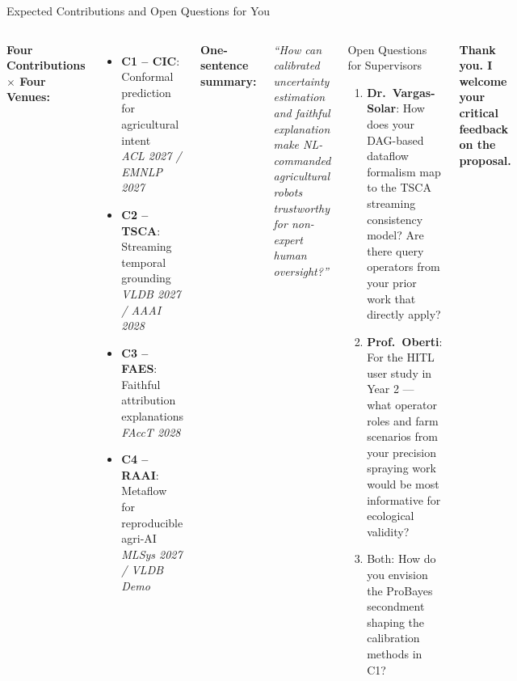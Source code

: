 \documentclass[aspectratio=169,10pt]{beamer}
\begin{document}
\begin{frame}{Expected Contributions and Open Questions for You}

\begin{columns}[T]
\textbf{\color{techblue}Four Contributions $\times$ Four Venues:}
\begin{itemize}\small
  \item \textbf{C1 -- CIC}: Conformal prediction for agricultural intent \\
    \textit{ACL 2027 / EMNLP 2027}
  \item \textbf{C2 -- TSCA}: Streaming temporal grounding \\
    \textit{VLDB 2027 / AAAI 2028}
  \item \textbf{C3 -- FAES}: Faithful attribution explanations \\
    \textit{FAccT 2028}
  \item \textbf{C4 -- RAAI}: Metaflow for reproducible agri-AI \\
    \textit{MLSys 2027 / VLDB Demo}
\end{itemize}

\medskip
\small
\textbf{One-sentence summary:}
\begin{center}
\itshape
``How can calibrated uncertainty estimation and faithful explanation make NL-commanded agricultural robots trustworthy for non-expert human oversight?''
\end{center}

\begin{alertblock}{Open Questions for Supervisors}
\begin{enumerate}\small
  \item \textbf{Dr.\ Vargas-Solar}: How does your DAG-based dataflow formalism map to the TSCA streaming consistency model? Are there query operators from your prior work that directly apply?
  \item \textbf{Prof.\ Oberti}: For the HITL user study in Year 2 --- what operator roles and farm scenarios from your precision spraying work would be most informative for ecological validity?
  \item Both: How do you envision the ProBayes secondment shaping the calibration methods in C1?
\end{enumerate}
\end{alertblock}

\medskip
\begin{center}
\small
\textbf{Thank you. I welcome your critical feedback on the proposal.}
\end{center}
\end{columns}

\end{frame}
\end{document}
